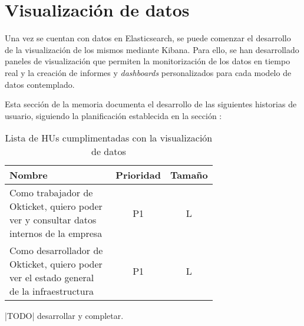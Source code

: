 \section{Visualización de datos}\label{sec:impl_visualizacion}
Una vez se cuentan con datos en Elasticsearch, se puede comenzar el desarrollo
de la visualización de los mismos mediante Kibana. Para ello, se han desarrollado
paneles de visualización que permiten la monitorización de los datos en tiempo
real y la creación de informes y \textit{dashboards} personalizados para cada
modelo de datos contemplado.

Esta sección de la memoria documenta el desarrollo de las siguientes historias
de usuario, siguiendo la planificación establecida en la sección :

\begin{table}[H]
	\centering
	\begin{tabular}{|p{0.7\linewidth}|c|c|}
		\hline
		\textbf{Nombre} & \textbf{Prioridad} & \textbf{Tamaño} \\
		\hline
		\hline
		Como trabajador de Okticket, quiero poder ver y consultar datos internos de la empresa & P1\cellcolor{orange!50} & L\cellcolor{orange!50} \\
		\hline
		Como desarrollador de Okticket, quiero poder ver el estado general de la infraestructura & P1\cellcolor{orange!50} & L\cellcolor{orange!50} \\
		\hline
  \end{tabular}
  \caption{Lista de HUs cumplimentadas con la visualización de datos}
  \label{tab:impl_visualizacion}
\end{table}

|TODO| desarrollar y completar.
